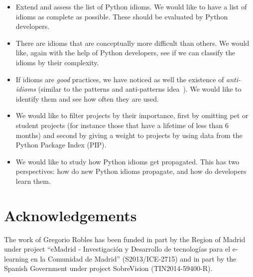\documentclass[a4paper]{article}
\begin{document}
\begin{itemize}

  \item Extend and assess the list of Python idioms. We would like to have a list of idioms as complete as possible. These should be evaluated by Python developers.
  
  \item There are idioms that are conceptually more difficult than others. We would like, again with the help of Python developers, see if we can classify the idioms by their complexity.
  
  \item If idioms are \emph{good} practices, we have noticed as well the existence of \emph{anti-idioms} (similar to the patterns and anti-patterns idea~\cite{brown1998antipatterns}). We would like to identify them and see how often they are used.
  
  \item We would like to filter projects by their importance, first by omitting pet or student projects (for instance those that have a lifetime of less than 6 months) and second by giving a weight to projects by using data from the Python Package Index (PIP).
  
  \item We would like to study how Python idioms get propagated. This has two perspectives: how do new Python idioms propagate, and how do developers learn them.

\end{itemize}

\section{Acknowledgements}

The work of Gregorio Robles has been funded in part by the Region of Madrid under project ``eMadrid - Investigaci\'on y Desarrollo de tecnolog\'ias para el e-learning en la Comunidad de Madrid'' (S2013/ICE-2715) and in part by the Spanish Government under project SobreVision (TIN2014-59400-R).




\end{document}

